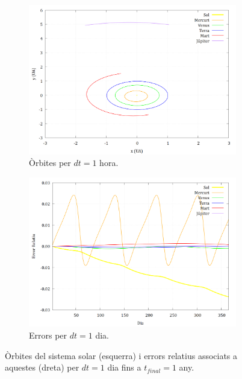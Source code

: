 \documentclass[10pt, twoside, a4paper]{article}
\begin{document}
\begin{figure}[h]
    \centering
    
    \begin{subfigure}[b]{0.495\linewidth}
        \centering
        \includegraphics[width=\linewidth]{../sist_solar/orbites_euler_1_d1dia.png}
        \caption{Òrbites per $dt=1$ hora.}
    \end{subfigure}
    \hfill
    \begin{subfigure}[b]{0.495\linewidth}
        \centering
        \includegraphics[width=\linewidth]{../Error/error_1_dia.png}
        \caption{Errors per $dt=1$ dia.}
    \end{subfigure}
    \caption{Òrbites del sistema solar (esquerra) i errors relatius associats a aquestes (dreta) per $dt=1$ dia fins a $t_{final}=1$ any.}
    \label{fig1}
\end{figure}
\end{document}
